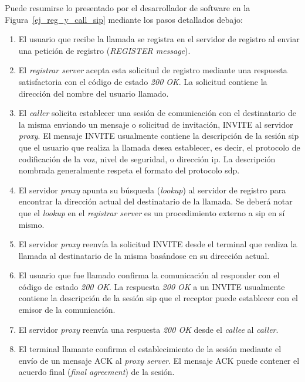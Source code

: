 \documentclass[a4paper,12pt]{report}
\begin{document}
Puede resumirse lo presentado por el desarrollador de software \cite{weichen}
en la Figura~\ref{ej_reg_y_call_sip} mediante los pasos detallados debajo:
\begin{enumerate}
\item El usuario que recibe la llamada se registra en el
servidor de registro al enviar una petición de registro
(\emph{REGISTER message}).

\item El \emph{registrar server} acepta esta solicitud de registro mediante una
respuesta satisfactoria con el código de estado \emph{200 OK}. La solicitud
contiene la dirección del nombre del usuario llamado.

\item El \emph{caller} solicita establecer una sesión de
comunicación con el destinatario de la misma enviando un mensaje o solicitud de
invitación, INVITE al servidor \emph{proxy}. El mensaje INVITE usualmente
contiene la descripción de la sesión \ac{sip} que el usuario que realiza la llamada
desea establecer, es decir, el protocolo de codificación de la voz, nivel de
seguridad, o dirección \ac{ip}. La descripción nombrada generalmente respeta el
formato del protocolo \ac{sdp}. 

\item El servidor \emph{proxy} apunta su búsqueda (\emph{lookup}) al servidor de registro
para encontrar la dirección actual del destinatario de la llamada. Se deberá
notar que el \emph{lookup} en el \emph{registrar server} es un procedimiento externo a
\ac{sip} en sí mismo. 

\item El servidor \emph{proxy} reenvía la solicitud INVITE desde el terminal que
realiza la llamada al destinatario de la misma basándose en su dirección
actual. 

\item El usuario que fue llamado confirma la comunicación al responder con el código
de estado \emph{200 OK}. La respuesta \emph{200 OK} a un INVITE
usualmente contiene la descripción de la sesión \ac{sip} que el receptor puede
establecer con el emisor de la comunicación. 

\item El servidor \emph{proxy} reenvía una respuesta \emph{200 OK} desde el
\emph{callee} al \emph{caller}.

\item El terminal llamante confirma el establecimiento de la sesión mediante el envío
de un mensaje ACK al \emph{proxy server}. El mensaje ACK puede contener
el acuerdo final (\emph{final agreement}) de la sesión.


\end{enumerate}
\end{document}
